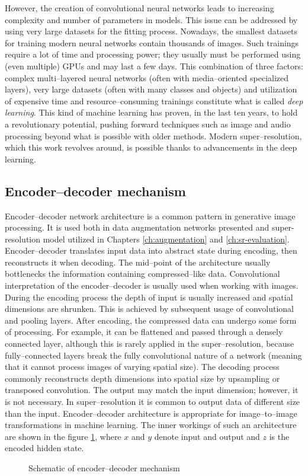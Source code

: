 However, the creation of convolutional neural networks leads to increasing complexity and number of parameters in models.
This issue can be addressed by using very large datasets for the fitting process.
Nowadays, the smallest datasets for training modern neural networks contain thousands of images.
Such trainings require a lot of time and processing power; they usually must be performed using (even multiple) GPUs and may last a few days.
This combination of three factors: complex multi--layered neural networks (often with media--oriented specialized layers), very large datasets (often with many classes and objects) and utilization of expensive time and resource--consuming trainings constitute what is called \textit{deep learning}.
This kind of machine learning has proven, in the last ten years, to hold a revolutionary potential, pushing forward techniques such as image and audio processing beyond what is possible with older methods.
Modern super--resolution, which this work revolves around, is possible thanks to advancements in the deep learning.

\subsection{Encoder--decoder mechanism}
Encoder--decoder network architecture is a common pattern in generative image processing.
It is used both in data augmentation networks presented and super-resolution model utilized in Chapters \ref{ch:augmentation} and \ref{ch:sr-evaluation}.
Encoder--decoder translates input data into abstract state during encoding, then reconstructs it when decoding.
The mid--point of the architecture usually bottlenecks the information containing compressed--like data.
Convolutional interpretation of the encoder--decoder is usually used when working with images.
During the encoding process the depth of input is usually increased and spatial dimensions are shrunken.
This is achieved by subsequent usage of convolutional and pooling layers.
After encoding, the compressed data can undergo some form of processing.
For example, it can be flattened and passed through a densely connected layer, although this is rarely applied in the super--resolution, because fully--connected layers break the fully convolutional nature of a network (meaning that it cannot process images of varying spatial size).
The decoding process commonly reconstructs depth dimensions into spatial size by upsampling or transposed convolution.
The output may match the input dimension; however, it is not necessary.
In super--resolution it is common to output data of different size than the input.
Encoder--decoder architecture is appropriate for image--to--image transformations in machine learning.
The inner workings of such an architecture are shown in the figure \ref{fig:encoder-decoder}, where $ x $ and $ y $ denote input and output and $ z $ is the encoded hidden state. 
\begin{figure}
    \centering
    
    \caption{Schematic of encoder--decoder mechanism}
    \label{fig:encoder-decoder}
\end{figure}


